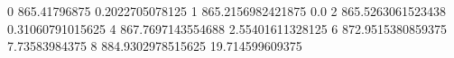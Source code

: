 0 865.41796875 0.2022705078125
1 865.2156982421875 0.0
2 865.5263061523438 0.31060791015625
4 867.7697143554688 2.55401611328125
6 872.9515380859375 7.73583984375
8 884.9302978515625 19.714599609375
